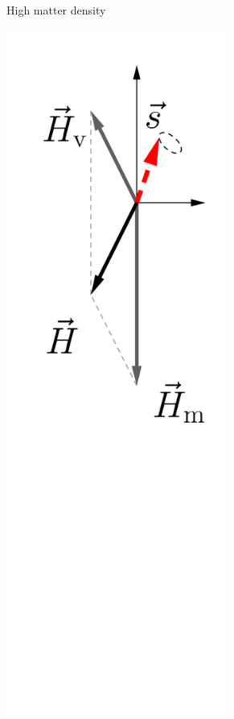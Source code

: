 \begin{figure}[htbp]
\begin{subfigure}[t]{0.3\textwidth}
		\caption{High matter density}\label{chap:basics-sec:flavor-isospin-pic-fig:msw-adiabatic-large-density}
	\end{subfigure}
	\quad
	\begin{subfigure}[t]{0.3\textwidth}
		\centering
		\includegraphics[width=0.8\textwidth]{chapters/assets/basics/matter-effect-adiabatic}

\end{subfigure}
\end{figure}
